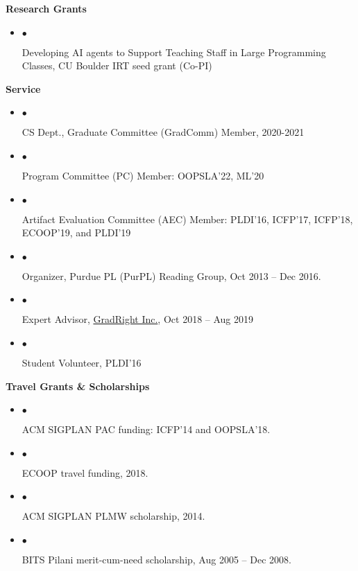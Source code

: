 \documentclass[10pt]{article}
\newcommand{\lbar}[1]{{\color{#1}\ding{118}}\hspace*{2pt}}
\newcommand{\service}[1]{\item $\bullet$ \hspace{1ex}\parbox{7.2in}{#1}}
\newenvironment{itemregion}[1]{
  \vspace*{0.5ex}
  {{\textbf{\large{#1}}}}
  \begin{itemize}\itemsep1pt}
  {\end{itemize}\vspace{0.8ex}}
\begin{document}


\begin{itemregion} {\lbar{Mahogany} Research Grants}
  \service{Developing AI agents to Support Teaching Staff in Large
  Programming Classes, CU Boulder IRT seed grant (Co-PI)}
\end{itemregion}

\begin{itemregion} {\lbar{Mahogany}Service}
  \service{CS Dept., Graduate Committee (GradComm) Member, 2020-2021}
  \service{Program Committee (PC) Member: OOPSLA'22, ML'20}
  \service{Artifact Evaluation Committee (AEC) Member: PLDI'16,
      ICFP'17, ICFP'18, ECOOP'19, and PLDI'19}
  \service{Organizer, Purdue PL (PurPL) Reading Group, Oct 2013 -- Dec 2016.}
  \service{Expert Advisor, \href{http://gradright.com}{GradRight Inc.}, Oct 2018 -- Aug 2019}
  \service{Student Volunteer, PLDI'16}
\end{itemregion}

\begin{itemregion}{\lbar{Mahogany}Travel Grants \& Scholarships}
  \service {ACM SIGPLAN PAC funding: ICFP'14 and OOPSLA'18.}
  \service {ECOOP travel funding, 2018.}
  \service {ACM SIGPLAN PLMW scholarship, 2014.}
  \service {BITS Pilani merit-cum-need scholarship, Aug 2005 -- Dec 2008.}
\end{itemregion}


\ifdefined\genrefs

\newpage
\end{document}

